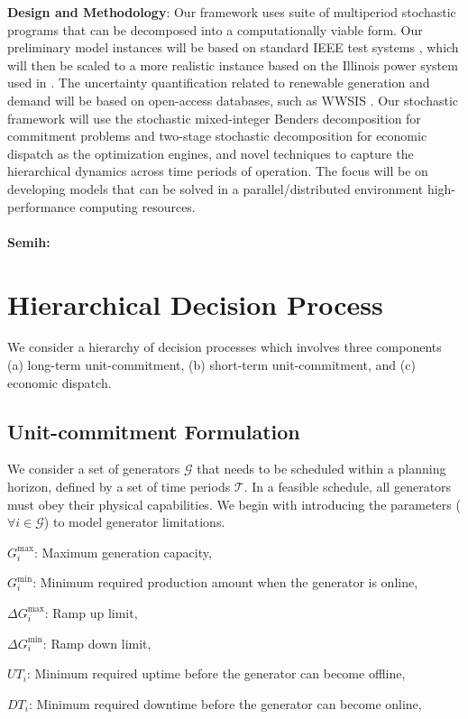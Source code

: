 {\bf Design and Methodology}: Our framework uses suite of multiperiod stochastic programs that can be decomposed into a computationally viable form. Our preliminary model instances will be based on standard IEEE test systems \cite{Chri99}, which will then be scaled to a more realistic instance based on the Illinois power system used in \cite{Gang16a}. The uncertainty quantification related to renewable generation and demand will be based on open-access databases, such as WWSIS \cite{Pott08}. Our stochastic framework will use the stochastic mixed-integer Benders decomposition for commitment problems and two-stage stochastic decomposition \cite{Higl94} for economic dispatch as the optimization engines, and novel techniques to capture the hierarchical dynamics across time periods of operation. The focus will be on developing models that can be solved in a parallel/distributed environment high-performance computing resources. 

\paragraph{Semih:} 

\section{Hierarchical Decision Process}
We consider a hierarchy of decision processes which involves three components (a) long-term unit-commitment, (b) short-term unit-commitment, and (c) economic dispatch. 

\subsection{Unit-commitment Formulation}
We consider a set of generators $\mathcal{G}$ that needs to be scheduled within a planning horizon, defined by a set of time periods $\mathcal{T}$. In a feasible schedule, all generators must obey their physical capabilities. We begin with introducing the parameters ($\forall i \in \mathcal{G}$) to model generator limitations.
\begin{description} \setlength{\itemsep}{-1pt}
\item{$G_i^{\max}$:} Maximum generation capacity, 
\item{$G_i^{\min}$: } Minimum required production amount when the generator is online, 
\item{$\Delta G_i^{\max}$: } Ramp up limit, 
\item{$\Delta G_i^{\min}$:} Ramp down limit,
\item{$UT_i$:} Minimum required uptime before the generator can become offline, 
\item{$DT_i$:} Minimum required downtime before the generator can become online,  
\end{description}

